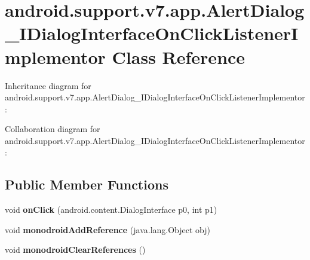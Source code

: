 \hypertarget{classandroid_1_1support_1_1v7_1_1app_1_1_alert_dialog___i_dialog_interface_on_click_listener_implementor}{}\section{android.\+support.\+v7.\+app.\+Alert\+Dialog\+\_\+\+I\+Dialog\+Interface\+On\+Click\+Listener\+Implementor Class Reference}
\label{classandroid_1_1support_1_1v7_1_1app_1_1_alert_dialog___i_dialog_interface_on_click_listener_implementor}


Inheritance diagram for android.\+support.\+v7.\+app.\+Alert\+Dialog\+\_\+\+I\+Dialog\+Interface\+On\+Click\+Listener\+Implementor\+:


Collaboration diagram for android.\+support.\+v7.\+app.\+Alert\+Dialog\+\_\+\+I\+Dialog\+Interface\+On\+Click\+Listener\+Implementor\+:
\subsection*{Public Member Functions}
\begin{DoxyCompactItemize}
\item 
\mbox{\label{classandroid_1_1support_1_1v7_1_1app_1_1_alert_dialog___i_dialog_interface_on_click_listener_implementor_a8e35c027fd2de981ed97054edd6cb86f}} 
void {\bfseries on\+Click} (android.\+content.\+Dialog\+Interface p0, int p1)
\item 
\mbox{\label{classandroid_1_1support_1_1v7_1_1app_1_1_alert_dialog___i_dialog_interface_on_click_listener_implementor_a7625377f1befd57755de35ba74a4fb9f}} 
void {\bfseries monodroid\+Add\+Reference} (java.\+lang.\+Object obj)
\item 
\mbox{\label{classandroid_1_1support_1_1v7_1_1app_1_1_alert_dialog___i_dialog_interface_on_click_listener_implementor_ab97868ba78e36937f05c4e816bb3cb5b}} 
void {\bfseries monodroid\+Clear\+References} ()
\end{DoxyCompactItemize}
